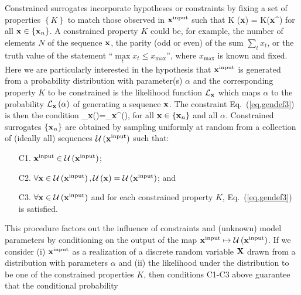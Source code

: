 \documentclass[%
prx,
reprint,
superscriptaddress,
nofootinbib,
 amsmath,amssymb,
 aps,
floatfix,
]{revtex4-2}
\let\oldequation\equation
\let\oldendequation\endequation
\renewenvironment{equation}{%
    \linenomathNonumbers\oldequation
    }{%
    \oldendequation\endlinenomath%
    }
\newcommand{\xin}{{{\bf x}^{\text{input}}}}
\begin{document}
Constrained surrogates incorporate hypotheses or constraints by fixing a set of properties $\left\{K\right\}$ to match those observed in $\xin$ such that
\begin{equation}\label{eq.gendef3}
K \left({\bf x}\right) = K\left(\xin\right)
\end{equation}
for all ${\bf x} \in \{ {\bf x}_n\}$.
A constrained property $K$ could be, for example, the number of elements $N$ of the sequence ${\bf x}$, the parity (odd or even) of the sum $\sum\limits_t x_t$, or the truth value of the statement ``$\max\limits_t x_t \leq x_{\max}$'', where $x_{\max}$ is known and fixed. 
Here we are particularly interested in the hypothesis that $\xin$ is generated from a probability distribution with parameter(s) $\alpha$ and the corresponding property $K$ to be constrained is the likelihood function $\mathcal{L}_{{\bf x}}$ %
which maps $\alpha$ to the probability $\mathcal{L}_{{\bf x}}\left( \alpha \right)$ of generating a sequence ${\bf x}$. The constraint Eq.~(\ref{eq.gendef3}) is then the condition
 \begin{equation}\label{eq.gendef4}
 _{{\bf x}}\left(\alpha\right)=_{\xin}\left(\alpha\right),
 \end{equation}%
 for all ${\bf x} \in \{ {\bf x}_n\}$ and all $\alpha$.
 Constrained surrogates $\{ {\bf x}_n\}$ are obtained by sampling uniformly at random from a collection of (ideally all) sequences $\mathcal{U}\left(\xin\right)$ such that:
\begin{itemize}
    \item[C1.] $\xin \in \mathcal{U} \left( \xin \right)$;
    \item[C2.] $\forall {\bf x} \in \mathcal{U} \left( \xin \right), \mathcal{U} \left( {\bf x} \right) = \mathcal{U} \left( \xin \right)$; and
    \item[C3.] %
    $\forall {\bf x} \in \mathcal{U} \left( \xin \right)$ and for each constrained property $K$, Eq.~(\ref{eq.gendef3}) is satisfied.
\end{itemize}
This procedure factors out the influence of constraints and (unknown) model parameters by conditioning on the output of the map $\xin \mapsto \mathcal{U} \left( \xin \right)$. If we consider (i) $\xin$ as a realization of a discrete random variable ${\bf X}$ drawn from a distribution with parameters $\alpha$ and (ii) the likelihood under the distribution to be one of the constrained properties $K$, then conditions C1-C3 above guarantee that the conditional probability
\end{document}

